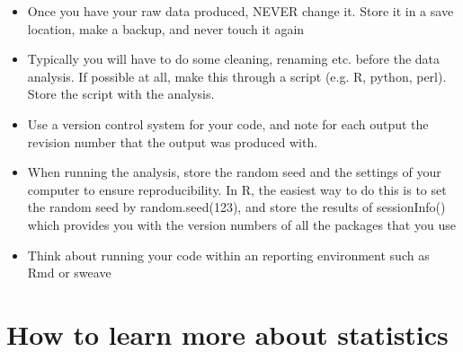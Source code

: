 \documentclass[a4paper,twoside]{tufte-book}\usepackage[]{graphicx}\usepackage[]{color}
\begin{document}
\begin{itemize}

\item{Once you have your raw data produced, NEVER change it. Store it in a save location, make a backup, and never touch it again}

\item{Typically you will have to do some cleaning, renaming etc. before the data analysis. If possible at all, make this through a script (e.g. R, python, perl). Store the script with the analysis.}

\item{Use a version control system for your code, and note for each output the revision number that the output was produced with.} 

\item{When running the analysis, store the random seed and the settings of your computer to ensure reproducibility. In R, the easiest way to do this is to set the random seed by random.seed(123), and store the results of sessionInfo() which provides you with the version numbers of all the packages that you use}

\item{Think about running your code within an reporting environment such as Rmd or sweave}



\end{itemize}

\section{How to learn more about statistics}\label{sec: further readings}
\end{document}
